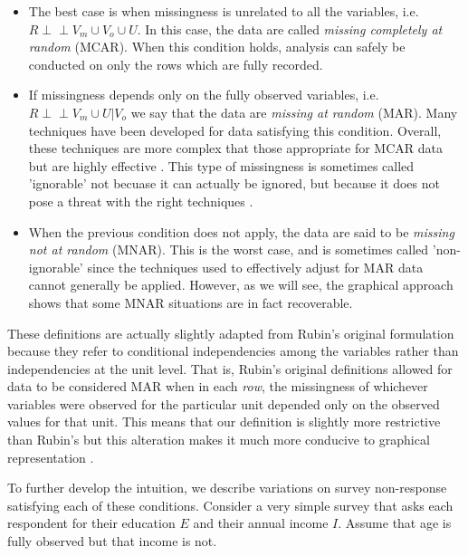 \documentclass[12pt,twoside]{reedthesis}
\theoremstyle{definition}
\newcommand{\dsep}{\perp \!\!\!\perp}
\begin{document}
\begin{itemize}
\item The best case is when missingness is unrelated to all the variables, i.e. $R \dsep V_m \cup V_o \cup U$. In this case, the data are called \emph{missing completely at random} (MCAR). When this condition holds, analysis can safely be conducted on only the rows which are fully recorded.

\item If missingness depends only on the fully observed variables, i.e.  $R \dsep V_m \cup U | V_o$ we say that the data are \emph{missing at random} (MAR). Many techniques have been developed for data satisfying this condition. Overall, these techniques are more complex that those appropriate for MCAR data but are highly effective \citep{Schafer_2002}. This type of missingness is sometimes called 'ignorable' not becuase it can actually be ignored, but because it does not pose a threat with the right techniques \citep{Pearl_2019}.

\item When  the previous condition does not apply, the data are said to be \emph{missing not at random} (MNAR). This is the worst case, and is sometimes called 'non-ignorable' since the techniques used to effectively adjust for MAR data cannot generally be applied. However, as we will see, the graphical approach shows that some MNAR situations are in fact recoverable.
\end{itemize}

These definitions are actually slightly adapted from Rubin's original formulation because they refer to conditional independencies among the variables rather than independencies at the unit level. That is, Rubin's original definitions allowed for data to be considered MAR when in each \emph{row}, the missingness of whichever variables were observed for the particular unit depended only on the observed values for that unit. This means that our definition is slightly more restrictive than Rubin's but this alteration makes it much more conducive to graphical representation \citep{Mohan_2013} \citep{Schafer_2002}.

To further develop the intuition, we describe variations on survey non-response satisfying each of these conditions.  Consider a very simple survey that asks each respondent for their education $E$ and their annual income $I$. Assume that age is fully observed but that income is not.
\end{document}
